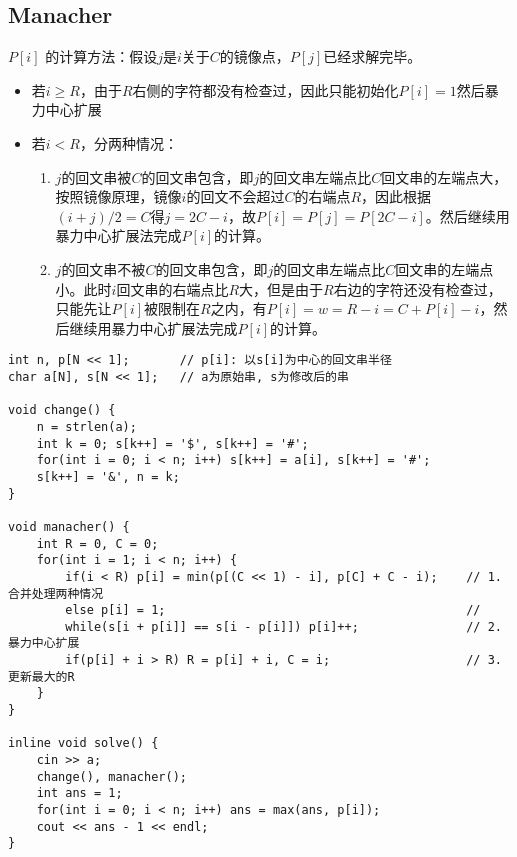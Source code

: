 \documentclass[]{article}
\providecommand{\tightlist}{%
  \setlength{\itemsep}{0pt}\setlength{\parskip}{0pt}}
\begin{document}
\hypertarget{manacher}{%
\subsection{Manacher}\label{manacher}}

\(P[i]\)
的计算方法：假设\(j\)是\(i\)关于\(C\)的镜像点，\(P[j]\)已经求解完毕。

\begin{itemize}
\tightlist
\item
  若\(i \geq R\)，由于\(R\)右侧的字符都没有检查过，因此只能初始化\(P[i] = 1\)然后暴力中心扩展
\item
  若\(i < R\)，分两种情况：

  \begin{enumerate}
  \def\labelenumi{\arabic{enumi}.}
  \tightlist
  \item
    \(j\)的回文串被\(C\)的回文串包含，即\(j\)的回文串左端点比\(C\)回文串的左端点大，按照镜像原理，镜像\(i\)的回文不会超过\(C\)的右端点\(R\)，因此根据\((i + j) / 2 = C\)得\(j = 2C - i\)，故\(P[i] = P[j] = P[2C - i]\)。然后继续用暴力中心扩展法完成\(P[i]\)的计算。
  \item
    \(j\)的回文串不被\(C\)的回文串包含，即\(j\)的回文串左端点比\(C\)回文串的左端点小。此时\(i\)回文串的右端点比\(R\)大，但是由于\(R\)右边的字符还没有检查过，只能先让\(P[i]\)被限制在\(R\)之内，有\(P[i] = w =R - i = C + P[i] - i\)，然后继续用暴力中心扩展法完成\(P[i]\)的计算。
  \end{enumerate}
\end{itemize}

\begin{verbatim}
int n, p[N << 1];       // p[i]: 以s[i]为中心的回文串半径
char a[N], s[N << 1];   // a为原始串, s为修改后的串

void change() {
    n = strlen(a);
    int k = 0; s[k++] = '$', s[k++] = '#';
    for(int i = 0; i < n; i++) s[k++] = a[i], s[k++] = '#';
    s[k++] = '&', n = k;
}

void manacher() {
    int R = 0, C = 0;
    for(int i = 1; i < n; i++) {
        if(i < R) p[i] = min(p[(C << 1) - i], p[C] + C - i);    // 1.合并处理两种情况
        else p[i] = 1;                                          //   
        while(s[i + p[i]] == s[i - p[i]]) p[i]++;               // 2.暴力中心扩展
        if(p[i] + i > R) R = p[i] + i, C = i;                   // 3.更新最大的R
    }   
}

inline void solve() {
    cin >> a;
    change(), manacher();
    int ans = 1;
    for(int i = 0; i < n; i++) ans = max(ans, p[i]);
    cout << ans - 1 << endl;
}
\end{verbatim}
\end{document}
